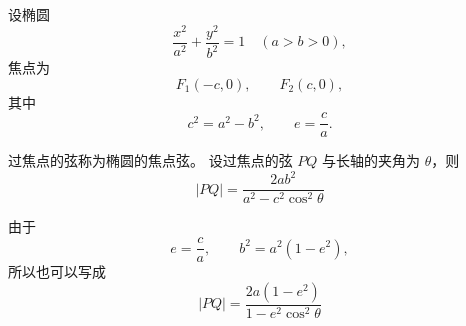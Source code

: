 设椭圆
\[
	\frac{x^2}{a^2}+\frac{y^2}{b^2}=1
	\quad (a>b>0),
\]
焦点为
\[
	F_1(-c,0),\qquad F_2(c,0),
\]
其中
\[
	c^2=a^2-b^2,\qquad e=\frac ca.
\]

过焦点的弦称为椭圆的焦点弦。
设过焦点的弦 \(PQ\) 与长轴的夹角为 \(\theta\)，则
\[
	\boxed{
		|PQ|=\frac{2ab^2}{a^2-c^2\cos^2\theta}
	}
\]

由于
\[
	e=\frac ca,
	\qquad b^2=a^2(1-e^2),
\]
所以也可以写成
\[
	\boxed{
		|PQ|=\frac{2a(1-e^2)}{1-e^2\cos^2\theta}
	}
\]
